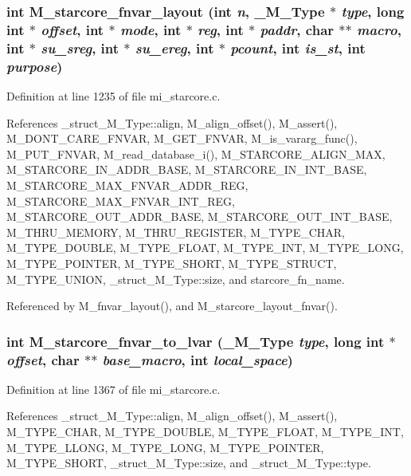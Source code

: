 \subsubsection{\setlength{\rightskip}{0pt plus 5cm}int M\_\-starcore\_\-fnvar\_\-layout (int {\em n}, \bf{\_\-M\_\-Type} $\ast$ {\em type}, long int $\ast$ {\em offset}, int $\ast$ {\em mode}, int $\ast$ {\em reg}, int $\ast$ {\em paddr}, char $\ast$$\ast$ {\em macro}, int $\ast$ {\em su\_\-sreg}, int $\ast$ {\em su\_\-ereg}, int $\ast$ {\em pcount}, int {\em is\_\-st}, int {\em purpose})}\label{m__starcore_8h_d5dd9b979ffac4638971c7f736d3a4bb}




Definition at line 1235 of file mi\_\-starcore.c.

References \_\-struct\_\-M\_\-Type::align, M\_\-align\_\-offset(), M\_\-assert(), M\_\-DONT\_\-CARE\_\-FNVAR, M\_\-GET\_\-FNVAR, M\_\-is\_\-vararg\_\-func(), M\_\-PUT\_\-FNVAR, M\_\-read\_\-database\_\-i(), M\_\-STARCORE\_\-ALIGN\_\-MAX, M\_\-STARCORE\_\-IN\_\-ADDR\_\-BASE, M\_\-STARCORE\_\-IN\_\-INT\_\-BASE, M\_\-STARCORE\_\-MAX\_\-FNVAR\_\-ADDR\_\-REG, M\_\-STARCORE\_\-MAX\_\-FNVAR\_\-INT\_\-REG, M\_\-STARCORE\_\-OUT\_\-ADDR\_\-BASE, M\_\-STARCORE\_\-OUT\_\-INT\_\-BASE, M\_\-THRU\_\-MEMORY, M\_\-THRU\_\-REGISTER, M\_\-TYPE\_\-CHAR, M\_\-TYPE\_\-DOUBLE, M\_\-TYPE\_\-FLOAT, M\_\-TYPE\_\-INT, M\_\-TYPE\_\-LONG, M\_\-TYPE\_\-POINTER, M\_\-TYPE\_\-SHORT, M\_\-TYPE\_\-STRUCT, M\_\-TYPE\_\-UNION, \_\-struct\_\-M\_\-Type::size, and starcore\_\-fn\_\-name.

Referenced by M\_\-fnvar\_\-layout(), and M\_\-starcore\_\-layout\_\-fnvar().
\subsubsection{\setlength{\rightskip}{0pt plus 5cm}int M\_\-starcore\_\-fnvar\_\-to\_\-lvar (\bf{\_\-M\_\-Type} {\em type}, long int $\ast$ {\em offset}, char $\ast$$\ast$ {\em base\_\-macro}, int {\em local\_\-space})}\label{m__starcore_8h_5ae5bf39f35fd66941859ae064f38489}




Definition at line 1367 of file mi\_\-starcore.c.

References \_\-struct\_\-M\_\-Type::align, M\_\-align\_\-offset(), M\_\-assert(), M\_\-TYPE\_\-CHAR, M\_\-TYPE\_\-DOUBLE, M\_\-TYPE\_\-FLOAT, M\_\-TYPE\_\-INT, M\_\-TYPE\_\-LLONG, M\_\-TYPE\_\-LONG, M\_\-TYPE\_\-POINTER, M\_\-TYPE\_\-SHORT, \_\-struct\_\-M\_\-Type::size, and \_\-struct\_\-M\_\-Type::type.
